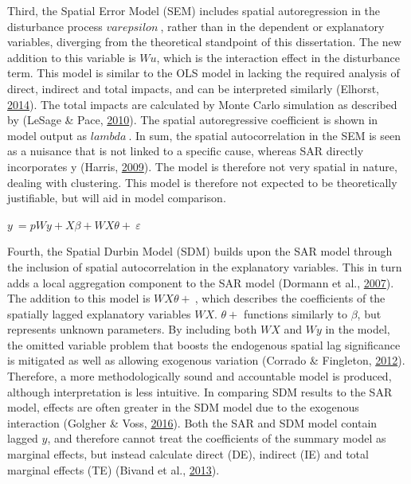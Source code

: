 \documentclass[12pt,twoside]{reedthesis}
\begin{document}
Third, the Spatial Error Model (SEM) includes spatial autoregression in the disturbance process \(varepsilon\ \), rather than in the dependent or explanatory variables, diverging from the theoretical standpoint of this dissertation. The new addition to this variable is \(Wu\), which is the interaction effect in the disturbance term. This model is similar to the OLS model in lacking the required analysis of direct, indirect and total impacts, and can be interpreted similarly (Elhorst, \protect\hyperlink{ref-elhorst2014}{2014}). The total impacts are calculated by Monte Carlo simulation as described by (LeSage \& Pace, \protect\hyperlink{ref-lesage2010}{2010}). The spatial autoregressive coefficient is shown in model output as \(lambda\ \). In sum, the spatial autocorrelation in the SEM is seen as a nuisance that is not linked to a specific cause, whereas SAR directly incorporates y (Harris, \protect\hyperlink{ref-harris2009}{2009}). The model is therefore not very spatial in nature, dealing with clustering. This model is therefore not expected to be theoretically justifiable, but will aid in model comparison.\\
\hspace*{0.333em}

\(y\ =pWy+X\beta+WX\theta+\ \varepsilon\)\\
\hspace*{0.333em}

Fourth, the Spatial Durbin Model (SDM) builds upon the SAR model through the inclusion of spatial autocorrelation in the explanatory variables. This in turn adds a local aggregation component to the SAR model (Dormann et al., \protect\hyperlink{ref-dormann2007}{2007}). The addition to this model is \(WX\theta+\ \), which describes the coefficients of the spatially lagged explanatory variables \(WX\). \(\theta+\) functions similarly to \(\beta\), but represents unknown parameters. By including both \(WX\) and \(Wy\) in the model, the omitted variable problem that boosts the endogenous spatial lag significance is mitigated as well as allowing exogenous variation (Corrado \& Fingleton, \protect\hyperlink{ref-corrado2012}{2012}). Therefore, a more methodologically sound and accountable model is produced, although interpretation is less intuitive. In comparing SDM results to the SAR model, effects are often greater in the SDM model due to the exogenous interaction (Golgher \& Voss, \protect\hyperlink{ref-golgher2016}{2016}). Both the SAR and SDM model contain lagged \(y\), and therefore cannot treat the coefficients of the summary model as marginal effects, but instead calculate direct (DE), indirect (IE) and total marginal effects (TE) (Bivand et al., \protect\hyperlink{ref-bivand2013}{2013}).\\
\hspace*{0.333em}
\end{document}
